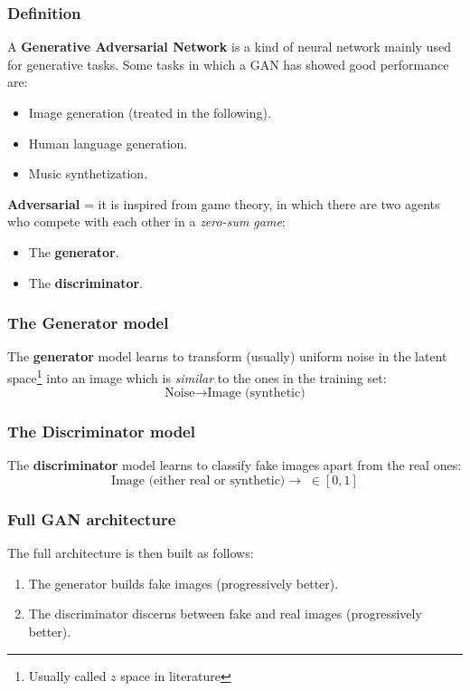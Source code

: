 \begin{frame}
    \frametitle{Definition}
    A \textbf{Generative Adversarial Network} is a kind of neural network mainly used for generative tasks. Some tasks in which a GAN has showed good performance are:
    \begin{itemize}
        \item Image generation (treated in the following).
        \item Human language generation.
        \item Music synthetization.
    \end{itemize}

    \textbf{Adversarial} = it is inspired from game theory, in which there are two agents who compete with each other in a \emph{zero-sum game}:
    \begin{itemize}
        \item The \textbf{generator}.
        \item The \textbf{discriminator}.
    \end{itemize}
\end{frame}

\begin{frame}
    \frametitle{The Generator model}
    The \textbf{generator} model learns to transform (usually) uniform noise in the latent space\footnote{Usually called $z$ space in literature} into an image which is \emph{similar} to the ones in the training set:
    $$\text{Noise} \to \text{Image (synthetic)}$$
\end{frame}

\begin{frame}
    \frametitle{The Discriminator model}
    The \textbf{discriminator} model learns to classify fake images apart from the real ones:
    $$\text{Image (either real or synthetic)} \to \; \in [0,1]$$
\end{frame}

\begin{frame}
    \frametitle{Full GAN architecture}
    The full architecture is then built as follows:
    \begin{enumerate}
        \item The generator builds fake images (progressively better).
        \item The discriminator discerns between fake and real images (progressively better).
    \end{enumerate}
\end{frame}

